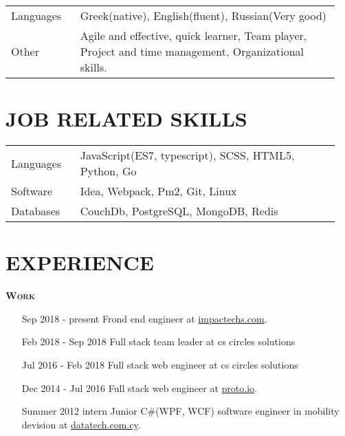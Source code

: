 \documentclass[margin, 10pt]{res} %
\begin{document}
\begin{resume}
\begin{tabular}{p{0.2\linewidth} p{0.75\linewidth}}
            Languages & Greek(native), English(fluent), Russian(Very good)                    \\
            Other & Agile and effective, quick learner, Team player, Project and time management, Organizational skills.

        \end{tabular}

        \section{JOB RELATED SKILLS}

        \begin{tabular}{p{0.2\linewidth} p{0.75\linewidth}}

            Languages & JavaScript(ES7, typescript), SCSS, HTML5, Python, Go \\
            Software & Idea, Webpack, Pm2, Git, Linux \\
            Databases & CouchDb, PostgreSQL, MongoDB, Redis

        \end{tabular}

        \section{EXPERIENCE}

        \textsc{ \textbf{Work}}

        \begin{itemize}
            \item[Sep 2018 - present] Frond end engineer at \href{http://impactechs.com}{impactechs.com}.  \\

            \item[Feb 2018 - Sep 2018] Full stack team leader at cs circles solutions  \\

            \item[Jul 2016 - Feb 2018] Full stack web engineer at cs circles solutions \\

            \item[Dec 2014 - Jul 2016] Full stack web engineer at
            \href{https://proto.io/}{proto.io}. \\

            \item[Summer 2012 intern] Junior C\#(WPF, WCF) software engineer in mobility devision at
            \href{http://www.datatech.com.cy/}{datatech.com.cy}. \\


\end{itemize}
\end{resume}
\end{document}
